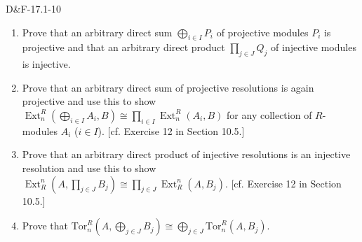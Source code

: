 \documentclass{article}
\newcommand{\tor}{\text{Tor}}
\begin{document}
	\begin{prb}{D\&F-17.1-10}
		$ $\newline \vspace{-0.65cm} 
		\begin{enumerate}[itemsep =-2pt,label = \textbf{(\alph{*})}]
			\item Prove that an arbitrary direct sum $\bigoplus_{i \in I}P_{i}$ of projective modules $P_{i}$ is projective and that an arbitrary direct product $\prod_{j \in J}Q_{j}$ of injective modules is injective. 
			\item Prove that an arbitrary direct sum of projective resolutions is again projective and use this to show $\operatorname{Ext}_{n}^{R}(\bigoplus_{i \in I}A_{i},B) \cong \prod_{i \in I}\operatorname{Ext}_{n}^{R}(A_{i}, B)$ for any collection of $R$-modules $A_{i}$ ($i \in I$). [cf. Exercise 12 in Section 10.5.] 
			\item Prove that an arbitrary direct product of injective resolutions is an injective resolution and use this to show $\operatorname{Ext}^{n}_{R}(A, \prod_{j \in J}B_{j}) \cong \prod_{j \in J}\operatorname{Ext}_{R}^{n}(A, B_{j})$. [cf. Exercise 12 in Section 10.5.]
			\item Prove that $\tor_{n}^{R}(A, \bigoplus_{j \in J}B_{j}) \cong \bigoplus_{j \in J}\tor_{n}^{R}(A, B_{j})$. 
		\end{enumerate}
	\end{prb}
	
\end{document}
